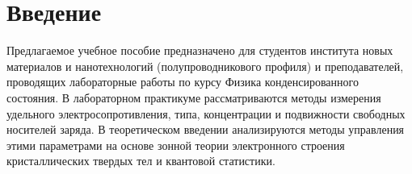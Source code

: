 \setcounter{chapter}{-1}
\chapter{Введение}

Предлагаемое учебное пособие предназначено для студентов института новых материалов и нанотехнологий (полупроводникового профиля) и преподавателей, проводящих лабораторные работы по курсу Физика конденсированного состояния. В лабораторном практикуме рассматриваются методы измерения удельного электросопротивления, типа, концентрации и подвижности свободных носителей заряда. В теоретическом введении анализируются методы управления этими параметрами на основе зонной теории электронного строения кристаллических твердых тел и квантовой статистики.